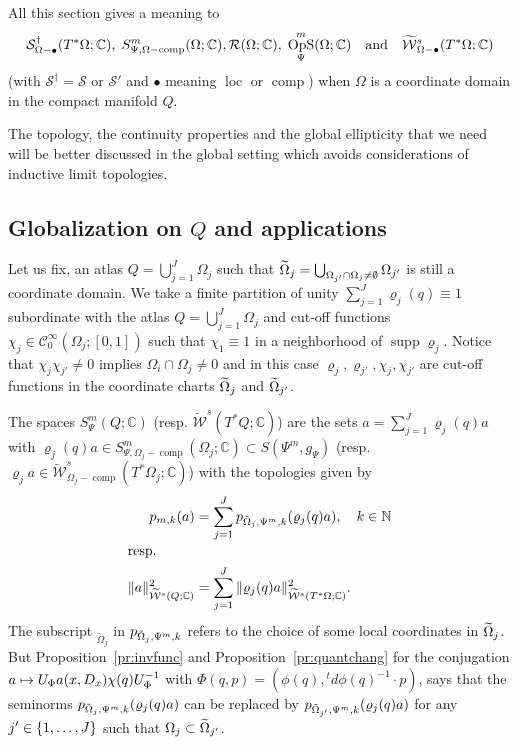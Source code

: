 \documentclass[AHL,Unicode,longabstracts]{cedram}
\newcommand{\C}{\mathbb{C}}
\newcommand{\N}{\mathbb{N}}
\newcommand{\clW}{\mathcal{W}}
\newcommand{\clC}{\mathcal{C}}
\newcommand{\clS}{\mathcal{S}}
\newcommand{\clR}{\mathcal{R}}
\DeclareMathOperator{\OpS}{OpS}
\DeclareMathOperator{\ccomp}{comp}
\DeclareMathOperator{\suppp}{supp}
\DeclareMathOperator{\locc}{loc}
\let\oldtilde\tilde
\renewcommand*{\tilde}[1]{\mathchoice{\widetilde{#1}}{\widetilde{#1}}{\oldtilde{#1}}{\oldtilde{#1}}}
\let\originalleft\left
\let\originalright\right
\renewcommand{\left}{\mathopen{}\mathclose\bgroup\originalleft}
\renewcommand{\right}{\aftergroup\egroup\originalright}
\let\oldmapsto\mapsto
\renewcommand*{\mapsto}{\mathchoice{\longmapsto}{\oldmapsto}{\oldmapsto}{\oldmapsto}}
\begin{document}
All this section gives a meaning to
\[
\clS^{\dagger}_{\Omega-\bullet}(T^{*}\Omega;\C),\; S^{m}_{\Psi,\Omega-\ccomp}(\Omega;\C), \clR(\Omega;\C),\; \OpS^{m}_{\Psi}(\Omega;\C) \quad\text{and}\quad \tilde{\clW}^{s}_{\Omega-\bullet}(T^{*}\Omega;\C)
\]
(with $\clS^{\dagger}=\clS$ or $\clS'$ and $\bullet$ meaning $\locc$ or $\ccomp$) when $\Omega$ is a coordinate domain in the compact manifold $Q$.

The topology, the continuity properties and the global ellipticity that we need will be better discussed in the global setting which avoids considerations of inductive limit topologies.

\subsection{Globalization on \texorpdfstring{$Q$}{Q} and applications}\label{sec:global}

Let us fix, an atlas $Q=\bigcup_{j=1}^{J}\Omega_{j}$ such that $\tilde{\Omega}_{j}=\bigcup_{\Omega_{j'}\cap \Omega_{j}\neq \emptyset}\Omega_{j'}$ is still a coordinate domain. We take a finite partition of unity $\sum_{j=1}^{J}\varrho_{j}(q)\equiv 1$ subordinate with the atlas $Q=\bigcup_{j=1}^{J}\Omega_{j}$ and cut-off functions $\chi_{j}\in \clC^{\infty}_{0}(\Omega_{j};[0,1])$ such that $\chi_{1}\equiv 1$ in a neighborhood of $\suppp\varrho_{j}$. Notice that $\chi_{j}\chi_{j'}\neq 0$ implies $\Omega_{i}\cap \Omega_{j}\neq 0$ and in this case $\varrho_{j},\varrho_{j'},\chi_{j},\chi_{j'}$ are cut-off functions in the coordinate charts $\tilde{\Omega}_{j}$ and $\tilde{\Omega}_{j'}$.

The spaces $S^{m}_{\Psi}(Q;\C)$ (resp. $\widetilde{\clW}^{s}(T^{*}Q;\C)$) are the sets $a=\sum_{j=1}^{J}\varrho_{j}(q)a$ with $\varrho_{j}(q)a\in S^{m}_{\Psi,\Omega_{j}-\ccomp}(\Omega_{j};\C)\subset S(\Psi^{m},g_{\Psi})$ (resp. $\varrho_{j}a \in \widetilde{\clW}^{s}_{\Omega_{j}-\ccomp}(T^{*}\Omega_{j};\C)$) with the topologies given by
\begin{align*}
 p_{m,k}(a)&=\sum_{j=1}^{J}p_{\tilde{\Omega}_{j},\Psi^{m},k}(\varrho_{j}(q)a),\quad k\in \N\\
\intertext{resp.} \|a\|_{\widetilde{\clW}^{s}(Q;\C)}^{2}
&=\sum_{j=1}^{J}\|\varrho_{j}(q)a\|^{2}_{\widetilde{\clW}^{s}(T^{*}\Omega;\C)}.
\end{align*}
The subscript $_{\widetilde{\Omega}_{j}}$ in $p_{\tilde\Omega_{j},\Psi^{m},k}$ refers to the choice of some local coordinates in $\tilde\Omega_{j}$. But Proposition~\ref{pr:invfunc} and Proposition~\ref{pr:quantchang} for the conjugation $a\mapsto U_{\Phi}a(x,D_{x})\chi(q)U_{\Phi}^{-1}$ with $\Phi(q,p)=(\phi(q),{}^{t}d\phi(q)^{-1}\cdot p)$, says that the seminorms $p_{\tilde{\Omega}_{j},\Psi^{m},k}(\varrho_{j}(q)a)$ can be replaced by $p_{\tilde{\Omega}_{j'},\Psi^{m},k}(\varrho_{j}(q)a)$ for any $j'\in \left\{1,\dots,J\right\}$ such that $\Omega_{j}\subset \tilde{\Omega}_{j'}$.
\end{document}
